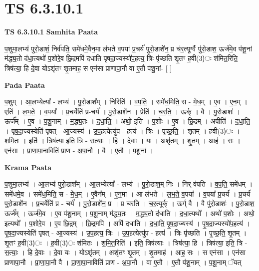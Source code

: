 \documentclass[17pt]{extarticle}
\begin{document}
\section{ TS 6.3.10.1 }

\textbf{TS 6.3.10.1 } \newline
\textbf{Samhita Paata} \newline

प॒शुमा॒लभ्य॑ पुरो॒डाशं॒ निर्व॑पति॒ समे॑धमे॒वैन॒मा ल॑भते व॒पया᳚ प्र॒चर्य॑ पुरो॒डाशे॑न॒ प्र च॑र॒त्यूर्ग्वै पु॑रो॒डाश॒ ऊर्ज॑मे॒व प॑शू॒नां म॑द्ध्य॒तो द॑धा॒त्यथो॑ प॒शोरे॒व छि॒द्रमपि॑ दधाति पृषदा॒ज्यस्यो॑प॒हत्य॒ त्रिः पृ॑च्छति शृ॒तꣳ ह॒वी(3)ः श॑मित॒रिति॒ त्रिष॑त्या॒ हि दे॒वा योऽशृ॑तꣳ शृ॒तमाह॒ स एन॑सा प्राणापा॒नौ वा ए॒तौ प॑शू॒नां- [  ] \newline

\textbf{Pada Paata} \newline

प॒शुम् । आ॒लभ्येत्या᳚ - लभ्य॑ । पु॒रो॒डाश᳚म् । निरिति॑ । व॒प॒ति॒ । समे॑ध॒मिति॒ स - मे॒ध॒म् । ए॒व । ए॒न॒म् । एति॑ । ल॒भ॒ते॒ । व॒पया᳚ । प्र॒चर्येति॑ प्र-चर्य॑ । पु॒रो॒डाशे॑न । प्रेति॑ । च॒र॒ति॒ । ऊर्क् । वै । पु॒रो॒डाशः॑ । ऊर्ज᳚म् । ए॒व । प॒शू॒नाम् । म॒द्ध्य॒तः । द॒धा॒ति॒ । अथो॒ इति॑ । प॒शोः । ए॒व । छि॒द्रम् । अपीति॑ । द॒धा॒ति॒ । पृ॒ष॒दा॒ज्यस्येति॑ पृषत् - आ॒ज्यस्य॑ । उ॒प॒हत्येत्यु॑प - हत्य॑ । त्रिः । पृ॒च्छ॒ति॒ । शृ॒तम् । ह॒वी(3)ः । श॒मि॒तः॒ । इति॑ । त्रिष॑त्या॒ इति॒ त्रि - स॒त्याः॒ । हि । दे॒वाः । यः । अशृ॑तम् । शृ॒तम् । आह॑ । सः । एन॑सा । प्रा॒णा॒पा॒नाविति॑ प्राण - अ॒पा॒नौ । वै । ए॒तौ । प॒शू॒नां ।  \newline


\textbf{Krama Paata} \newline

प॒शुमा॒लभ्य॑ । आ॒लभ्य॑ पुरो॒डाश᳚म् । आ॒लभ्येत्या᳚ - लभ्य॑ । पु॒रो॒डाश॒म् निः । निर् व॑पति । व॒प॒ति॒ समे॑धम् । समे॑धमे॒व । समे॑ध॒मिति॒ स - मे॒ध॒म् । ए॒वैन᳚म् । ए॒न॒मा । आ ल॑भते । ल॒भ॒ते॒ व॒पया᳚ । व॒पया᳚ प्र॒चर्य॑ । प्र॒चर्य॑ पुरो॒डाशे॑न । प्र॒चर्येति॑ प्र - चर्य॑ । पु॒रो॒डाशे॑न॒ प्र । प्र च॑रति । च॒र॒त्यूर्क् । ऊर्ग् वै । वै पु॑रो॒डाशः॑ । पु॒रो॒डाश॒ ऊर्ज᳚म् । ऊर्ज॑मे॒व । ए॒व प॑शू॒नाम् । प॒शू॒नाम् म॑द्ध्य॒तः । म॒द्ध्य॒तो द॑धाति । द॒धा॒त्यथो᳚ । अथो॑ प॒शोः । अथो॒ इत्यथो᳚ । प॒शोरे॒व । ए॒व छि॒द्रम् । छि॒द्रमपि॑ । अपि॑ दधाति । द॒धा॒ति॒ पृ॒ष॒दा॒ज्यस्य॑ । पृ॒ष॒दा॒ज्यस्यो॑प॒हत्य॑ । पृ॒ष॒दा॒ज्यस्येति॑ पृषत् - आ॒ज्यस्य॑ । उ॒प॒हत्य॒ त्रिः । उ॒प॒हत्येत्यु॑प - हत्य॑ । त्रिः पृ॑च्छति । पृ॒च्छ॒ति॒ शृ॒तम् । शृ॒तꣳ ह॒वी(3)ः । ह॒वी(3)ः श॑मितः । श॒मि॒त॒रिति॑ । इति॒ त्रिष॑त्याः । त्रिष॑त्या॒ हि । त्रिष॑त्या॒ इति॒ त्रि - स॒त्याः॒ । हि दे॒वाः । दे॒वा यः । योऽशृ॑तम् । अशृ॑तꣳ शृ॒तम् । शृ॒तमाह॑ । आह॒ सः । स एन॑सा । एन॑सा प्राणापा॒नौ । प्रा॒णा॒पा॒नौ वै । प्रा॒णा॒पा॒नाविति॑ प्राण - अ॒पा॒नौ । वा ए॒तौ । ए॒तौ प॑शू॒नाम् । प॒शू॒नाम् ॅयत् \newline
\end{document}
